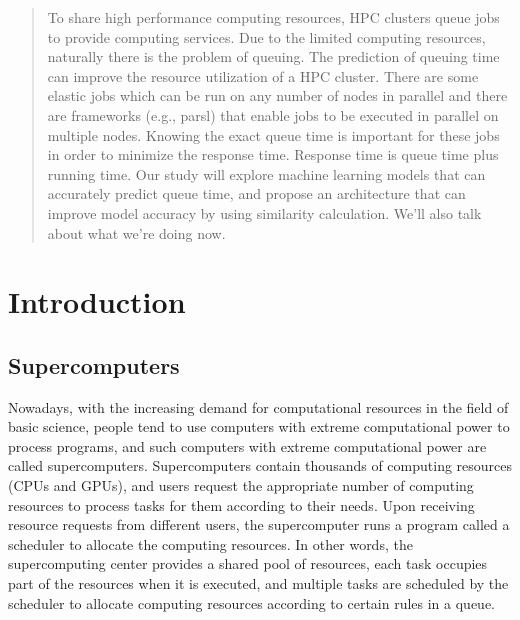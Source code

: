 \documentclass[conference,compsoc]{IEEEtran}
\begin{document}


\begin{abstract}
	
	To share high performance computing resources, HPC clusters queue jobs to provide computing services. Due to the limited computing resources, naturally there is the problem of queuing. The prediction of queuing time can improve the resource utilization of a HPC cluster. There are some elastic jobs which can be run on any number of nodes in parallel and there are frameworks (e.g., parsl) that enable jobs to be executed in parallel on multiple nodes. Knowing the exact queue time is important for these jobs in order to minimize the response time. Response time is queue time plus running time. Our study will explore machine learning models that can accurately predict queue time, and propose an architecture that can improve model accuracy by using similarity calculation. We'll also talk about what we're doing now.
	
\end{abstract}


\section{Introduction}
\subsection{Supercomputers}

Nowadays, with the increasing demand for computational resources in the field of basic science, people tend to use computers with extreme computational power to process programs, and such computers with extreme computational power are called supercomputers. Supercomputers contain thousands of computing resources (CPUs and GPUs), and users request the appropriate number of computing resources to process tasks for them according to their needs. Upon receiving resource requests from different users, the supercomputer runs a program called a scheduler to allocate the computing resources. In other words, the supercomputing center provides a shared pool of resources, each task occupies part of the resources when it is executed, and multiple tasks are scheduled by the scheduler to allocate computing resources according to certain rules in a queue.
\end{document}
